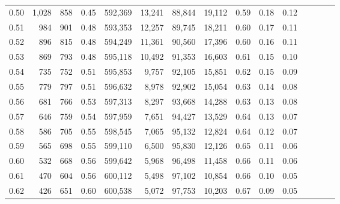\begin{tabular}{rrrcrrrrrrrrrrr}
0.50 &   1,028 &    858 &                                       0.45 &  592,369 &   13,241 &   88,844 &   19,112 &  0.59 &  0.18 &                         0.12 \\
0.51 &     984 &    901 &                                       0.48 &  593,353 &   12,257 &   89,745 &   18,211 &  0.60 &  0.17 &                         0.11 \\
0.52 &     896 &    815 &                                       0.48 &  594,249 &   11,361 &   90,560 &   17,396 &  0.60 &  0.16 &                         0.11 \\
0.53 &     869 &    793 &                                       0.48 &  595,118 &   10,492 &   91,353 &   16,603 &  0.61 &  0.15 &                         0.10 \\
0.54 &     735 &    752 &                                       0.51 &  595,853 &    9,757 &   92,105 &   15,851 &  0.62 &  0.15 &                         0.09 \\
0.55 &     779 &    797 &                                       0.51 &  596,632 &    8,978 &   92,902 &   15,054 &  0.63 &  0.14 &                         0.08 \\
0.56 &     681 &    766 &                                       0.53 &  597,313 &    8,297 &   93,668 &   14,288 &  0.63 &  0.13 &                         0.08 \\
0.57 &     646 &    759 &                                       0.54 &  597,959 &    7,651 &   94,427 &   13,529 &  0.64 &  0.13 &                         0.07 \\
0.58 &     586 &    705 &                                       0.55 &  598,545 &    7,065 &   95,132 &   12,824 &  0.64 &  0.12 &                         0.07 \\
0.59 &     565 &    698 &                                       0.55 &  599,110 &    6,500 &   95,830 &   12,126 &  0.65 &  0.11 &                         0.06 \\
0.60 &     532 &    668 &                                       0.56 &  599,642 &    5,968 &   96,498 &   11,458 &  0.66 &  0.11 &                         0.06 \\
0.61 &     470 &    604 &                                       0.56 &  600,112 &    5,498 &   97,102 &   10,854 &  0.66 &  0.10 &                         0.05 \\
0.62 &     426 &    651 &                                       0.60 &  600,538 &    5,072 &   97,753 &   10,203 &  0.67 &  0.09 &                         0.05 \\

\end{tabular}
